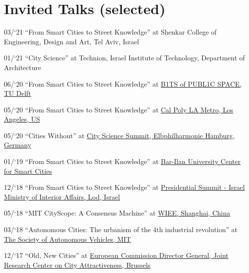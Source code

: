 \section*{Invited Talks (selected)}

\begin{tablist}

    \item[03/`21] \tab \enquote{From Smart Cities to Street Knowledge} at
    {Shenkar College of Engineering, Design and Art, Tel Aviv, Israel}

    \item[01/`21] \tab \enquote{City Science} at
    {Technion, Israel Institute of Technology, Department of Architecture}

    \item[06/`20] \tab \enquote{From Smart Cities to Street Knowledge} at
    \href{http://www.polistudelft.nl/urbanism-week/b1ts-of-publ1c-space-3-0/}{B1TS of PUBL1C SPACE, TU Delft}

    \item[05/`20] \tab \enquote{From Smart Cities to Street Knowledge} at
    \href{https://www.youtube.com/watch?v=Rh5ks9x3720}{Cal Poly LA Metro, Los Angeles, US}

    \item[05/`20] \tab \enquote{Cities Without} at
    \href{https://www.youtube.com/watch?v=PZg6A_A65lQ}{City Science Summit, Elbphilharmonie Hamburg, Germany}

    \item[01/`19] \tab \enquote{From Smart Cities to Street Knowledge} at
    \href{https://law.biu.ac.il/sites/law/files/shared/mrym_khkmvt_lkhkmt_hrkhvb.pdf}{
        Bar-Ilan University Center for Smart Cities}

    \item[12/`18] \tab \enquote{From Smart Cities to Street Knowledge} at
    \href{https://www.youtube.com/watch?v=skIEkM9-1yg}{Presidential Summit - Israel Ministry of Interior Affairs, Lod, Israel}

    \item[05/`18] \tab \enquote{MIT CityScope: A Consensus Machine} at
    \href{https://wiee.tongji.edu.cn/CSS2018/}{WIEE, Shanghai, China}

    \item[03/`18] \tab \enquote{Autonomous Cities: The urbanism of the 4th industrial revolution} at \href{http://cameraculture.media.mit.edu/category/blog/}{The Society of Autonomous Vehicles, MIT}

    \item[12/`17] \tab \enquote{Old, New Cities} at \href{https://www.youtube.com/watch?v=AW-ljDEleLw}{European Commission Director General, Joint Research Center on City Attractiveness, Brussels}


\end{tablist}
